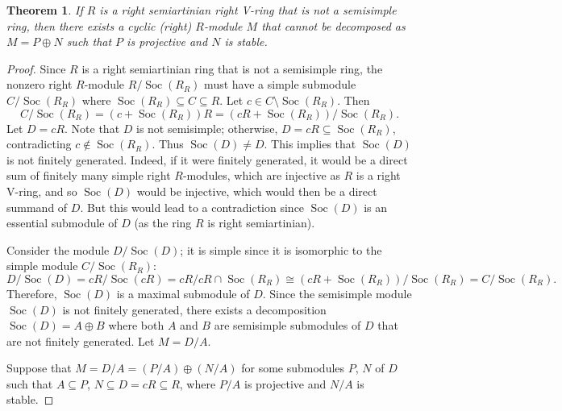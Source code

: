 \documentclass[11pt,a4paper]{amsart}
\theoremstyle{plain}
\newtheorem{theorem}{Theorem}[section]
\theoremstyle{definition}
\theoremstyle{remark}
\newcommand{\Soc}{\operatorname{Soc}}
\begin{document}
\begin{theorem} \label{Ex:Cyclicmodule} If $R$ is a right semiartinian right V-ring that is not a semisimple ring, then there exists a \emph{cyclic} (right) $R$-module $M$ that cannot be decomposed as $M=P\oplus N$ such that $P$ is projective and $N$ is stable.
\end{theorem}
\begin{proof}

Since $R$ is a right semiartinian ring that is not a semisimple ring, the nonzero right $R$-module $R/\Soc(R_R)$ must have a simple submodule $C/\Soc(R_R)$ where $\Soc(R_R)\subseteq C \subseteq R$. Let $c\in C\setminus \Soc(R_R)$. Then \[C/\Soc(R_R)=(c+\Soc(R_R))R=(cR+\Soc(R_R))/\Soc(R_R).\] Let $D=cR$. Note that $D$ is not semisimple; otherwise, $D=cR\subseteq \Soc(R_R)$, contradicting $c \notin \Soc(R_R)$.
Thus $\operatorname{Soc}(D) \neq D$. This implies that $\Soc (D)$ is not finitely generated. Indeed, if it were finitely generated, it would be a direct sum of finitely many simple right
$R$-modules, which are injective as $R$ is a right V-ring, and so $\Soc(D)$ would be injective, which would then be a direct summand of $D$. But this would lead to a contradiction since $\Soc (D)$ is an essential submodule of $D$ (as the ring $R$ is right semiartinian).

Consider the module $D/\Soc(D)$; it is simple since it is isomorphic to the simple module $ C/\Soc(R_R) $:
\[D/\Soc(D)=cR/\Soc(cR)=cR/cR\cap \Soc(R_R)\cong (cR+\Soc(R_R))/\Soc(R_R)= C/\Soc(R_R).\] {Therefore, $\Soc(D)$ is a maximal submodule of $D$. Since the semisimple module} $\Soc(D)$ is not finitely generated, there exists a decomposition $\Soc(D)=A\oplus B$ where both $A$  and $B$ are semisimple submodules of $D$ that are not finitely generated. Let $M=D/A$.

Suppose that $M=D/A=(P/A)\oplus (N/A)$ for some submodules $P$, $N$ of $D$ such that $A\subseteq P$, $N \subseteq D=cR\subseteq R$, where $P/A$ is projective and $N/A$ {is stable}.


\end{proof}
\end{document}
